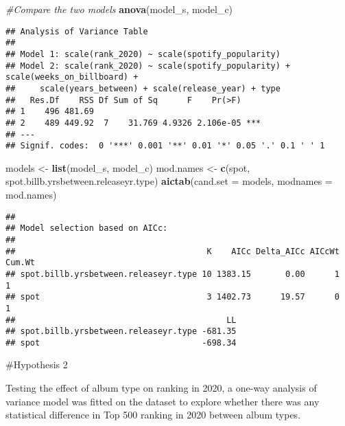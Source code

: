 \documentclass[
]{article}
\newenvironment{Shaded}{\begin{snugshade}}{\end{snugshade}}
\newcommand{\AttributeTok}[1]{\textcolor[rgb]{0.13,0.29,0.53}{#1}}
\newcommand{\CommentTok}[1]{\textcolor[rgb]{0.56,0.35,0.01}{\textit{#1}}}
\newcommand{\FunctionTok}[1]{\textcolor[rgb]{0.13,0.29,0.53}{\textbf{#1}}}
\newcommand{\NormalTok}[1]{#1}
\newcommand{\OtherTok}[1]{\textcolor[rgb]{0.56,0.35,0.01}{#1}}
\newcommand{\StringTok}[1]{\textcolor[rgb]{0.31,0.60,0.02}{#1}}
\begin{document}
\begin{Shaded}
\begin{Highlighting}[]
\CommentTok{\#Compare the two models}
\FunctionTok{anova}\NormalTok{(model\_s, model\_c)}
\end{Highlighting}
\end{Shaded}

\begin{verbatim}
## Analysis of Variance Table
## 
## Model 1: scale(rank_2020) ~ scale(spotify_popularity)
## Model 2: scale(rank_2020) ~ scale(spotify_popularity) + scale(weeks_on_billboard) + 
##     scale(years_between) + scale(release_year) + type
##   Res.Df    RSS Df Sum of Sq      F    Pr(>F)    
## 1    496 481.69                                  
## 2    489 449.92  7    31.769 4.9326 2.106e-05 ***
## ---
## Signif. codes:  0 '***' 0.001 '**' 0.01 '*' 0.05 '.' 0.1 ' ' 1
\end{verbatim}

\begin{Shaded}
\begin{Highlighting}[]
\NormalTok{models }\OtherTok{\textless{}{-}} \FunctionTok{list}\NormalTok{(model\_s, model\_c)}
\NormalTok{mod.names }\OtherTok{\textless{}{-}} \FunctionTok{c}\NormalTok{(}\StringTok{\textquotesingle{}spot\textquotesingle{}}\NormalTok{, }\StringTok{\textquotesingle{}spot.billb.yrsbetween.releaseyr.type\textquotesingle{}}\NormalTok{)}
\FunctionTok{aictab}\NormalTok{(}\AttributeTok{cand.set =}\NormalTok{ models, }\AttributeTok{modnames =}\NormalTok{ mod.names)}
\end{Highlighting}
\end{Shaded}

\begin{verbatim}
## 
## Model selection based on AICc:
## 
##                                       K    AICc Delta_AICc AICcWt Cum.Wt
## spot.billb.yrsbetween.releaseyr.type 10 1383.15       0.00      1      1
## spot                                  3 1402.73      19.57      0      1
##                                           LL
## spot.billb.yrsbetween.releaseyr.type -681.35
## spot                                 -698.34
\end{verbatim}

\#Hypothesis 2

Testing the effect of album type on ranking in 2020, a one-way analysis
of variance model was fitted on the dataset to explore whether there was
any statistical difference in Top 500 ranking in 2020 between album
types.
\end{document}
